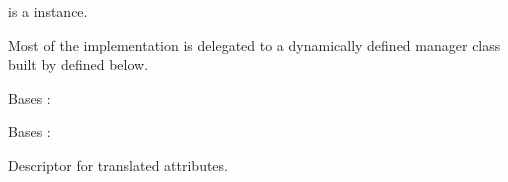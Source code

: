 \documentclass[letterpaper,10pt,french]{sphinxmanual}
\begin{document}
\begin{fulllineitems}
\begin{fulllineitems}
\begin{sphinxVerbatim}[commandchars=\\\{\}]
       
\end{sphinxVerbatim}

\sphinxAtStartPar
{} is a  instance.

\sphinxAtStartPar
Most of the implementation is delegated to a dynamically defined manager
class built by  defined below.

\end{fulllineitems}


\begin{fulllineitems}
\label{\detokenize{index:bookings.models.SeasonInfo.DoesNotExist}}
\pysigstartsignatures
\pysigline
{}
\pysigstopsignatures
\sphinxAtStartPar
Bases : 

\end{fulllineitems}


\begin{fulllineitems}
\label{\detokenize{index:bookings.models.SeasonInfo.MultipleObjectsReturned}}
\pysigstartsignatures
\pysigline
{}
\pysigstopsignatures
\sphinxAtStartPar
Bases : 

\end{fulllineitems}


\begin{fulllineitems}
\label{\detokenize{index:bookings.models.SeasonInfo.high_season_end}}
\pysigstartsignatures
\pysigline
{}
\pysigstopsignatures
\sphinxAtStartPar
Descriptor for translated attributes.


\end{fulllineitems}
\end{fulllineitems}
\end{document}
